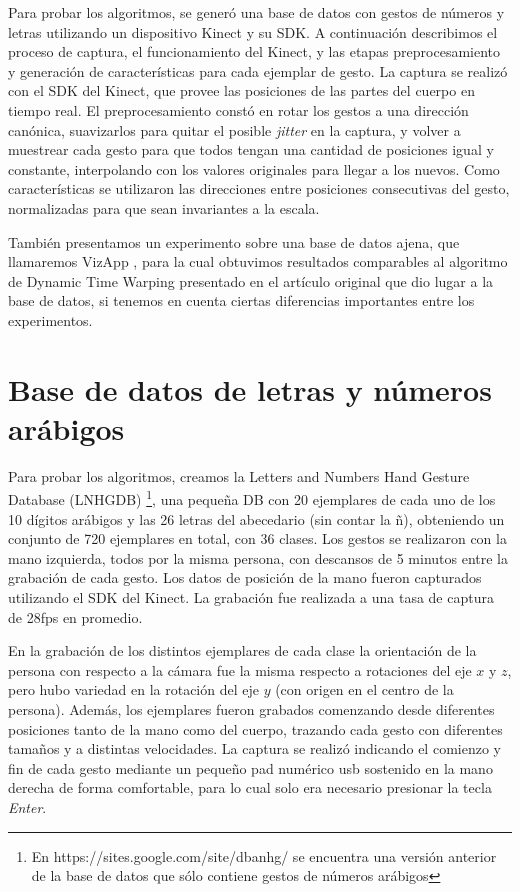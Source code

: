 

Para probar los algoritmos, se generó una base de datos con gestos de números y letras utilizando un dispositivo Kinect y su SDK. A continuación describimos el proceso de captura, el funcionamiento del Kinect, y las etapas preprocesamiento y generación de características para cada ejemplar de gesto. La captura se realizó con el SDK del Kinect, que provee las posiciones de las partes del cuerpo en tiempo real. El preprocesamiento constó en rotar los gestos a una dirección canónica, suavizarlos para quitar el posible \textit{jitter} en la captura, y volver a muestrear cada gesto para que todos tengan una cantidad de posiciones igual y constante, interpolando con los valores originales para llegar a los nuevos. Como características se utilizaron las direcciones entre posiciones consecutivas del gesto, normalizadas para que sean invariantes a la escala.

También presentamos un experimento sobre una base de datos ajena, que llamaremos VizApp \cite{}, para la cual obtuvimos resultados comparables al algoritmo de Dynamic Time Warping presentado en el artículo original que dio lugar a la base de datos, si tenemos en cuenta ciertas diferencias importantes entre los experimentos. 

\section{Base de datos de letras y números arábigos}

Para probar los algoritmos, creamos la Letters and Numbers Hand Gesture Database (LNHGDB) \footnote{En https://sites.google.com/site/dbanhg/ se encuentra una versión anterior de la base de datos que sólo contiene gestos de números arábigos}, una pequeña DB con 20 ejemplares de cada uno de los 10 dígitos arábigos y las 26 letras del abecedario (sin contar la ñ), obteniendo un conjunto de 720 ejemplares en total, con 36 clases. Los gestos se realizaron con la mano izquierda, todos por la misma persona, con descansos de 5 minutos entre la grabación de cada gesto. Los datos de posición de la mano fueron capturados utilizando el SDK del Kinect. La grabación fue realizada a una tasa de captura de 28fps en promedio. 

En la grabación de los distintos ejemplares de cada clase la orientación de la persona con respecto a la cámara fue la misma respecto a rotaciones del eje $x$ y $z$, pero hubo variedad en la rotación del eje $y$ (con origen en el centro de la persona). Además, los ejemplares fueron grabados comenzando desde diferentes posiciones tanto de la mano como del cuerpo, trazando cada gesto con diferentes tamaños y a distintas velocidades. La captura se realizó indicando el comienzo y fin de cada gesto mediante un pequeño pad numérico usb sostenido en la mano derecha de forma comfortable, para lo cual solo era necesario presionar la tecla \textit{Enter}.

